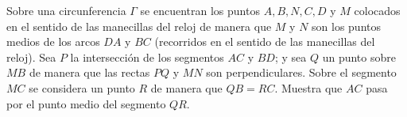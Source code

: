 Sobre una circunferencia $\Gamma$ se encuentran los puntos $A, B, N , C, D$ y $M$ colocados en el
sentido de las manecillas del reloj de manera que $M$ y $N$ son los puntos medios de los
arcos $DA$ y $BC$ (recorridos en el sentido de las manecillas del reloj). Sea $P$ la intersección
de los segmentos $AC$ y $BD$; y sea $Q$ un punto sobre $MB$ de manera que las rectas $PQ$
y $MN$ son perpendiculares. Sobre el segmento $MC$ se considera un punto $R$ de manera
que $QB = RC$. Muestra que $AC$ pasa por el punto medio del segmento $QR$.
